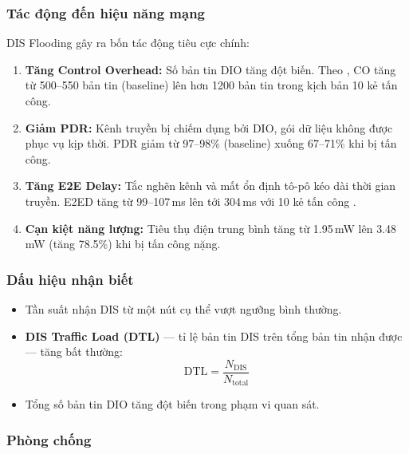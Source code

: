 \subsubsection{Tác động đến hiệu năng mạng}

DIS Flooding gây ra bốn tác động tiêu cực chính:

\begin{enumerate}
    \item \textbf{Tăng Control Overhead:} Số bản tin DIO tăng đột biến.
          Theo \cite{prajisha2025dis}, CO tăng từ 500--550 bản tin (baseline)
          lên hơn 1200 bản tin trong kịch bản 10 kẻ tấn công.

    \item \textbf{Giảm PDR:} Kênh truyền bị chiếm dụng bởi DIO, gói dữ
          liệu không được phục vụ kịp thời. PDR giảm từ 97--98\%
          (baseline) xuống 67--71\% khi bị tấn công.

    \item \textbf{Tăng E2E Delay:} Tắc nghẽn kênh và mất ổn định tô-pô
          kéo dài thời gian truyền. E2ED tăng từ 99--107\,ms lên tới
          304\,ms với 10 kẻ tấn công \cite{prajisha2025dis}.

    \item \textbf{Cạn kiệt năng lượng:} Tiêu thụ điện trung bình tăng
          từ 1.95\,mW lên 3.48\,mW (tăng 78.5\%) khi bị tấn công nặng.
\end{enumerate}

\subsubsection{Dấu hiệu nhận biết}

\begin{itemize}
    \item Tần suất nhận DIS từ một nút cụ thể vượt ngưỡng bình thường.
    \item \textbf{DIS Traffic Load (DTL)} --- tỉ lệ bản tin DIS trên
          tổng bản tin nhận được --- tăng bất thường:
          \begin{equation}
              \text{DTL} = \frac{N_{\text{DIS}}}{N_{\text{total}}}
              \label{eq:dtl}
          \end{equation}
    \item Tổng số bản tin DIO tăng đột biến trong phạm vi quan sát.
\end{itemize}

\subsubsection{Phòng chống}

